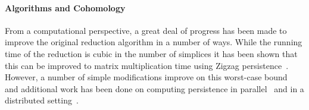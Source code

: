 %
%
%
%




\paragraph{Algorithms and Cohomology}

From a computational perspective, a great deal of progress has been made to improve the original reduction algorithm in a number of ways.
While the running time of the reduction is cubic in the number of simplices it has been shown that this can be improved to matrix multiplication time using Zigzag persistence~\cite{milosavljevic2011zigzag}.
However, a number of simple modifications improve on this worst-case bound~\cite{chen2011persistent,bauer2014clear} and additional work has been done on computing persistence in parallel~\cite{lewis15parallel} and in a distributed setting~\cite{tahbaz10distributed,bauer2014distributed}.

